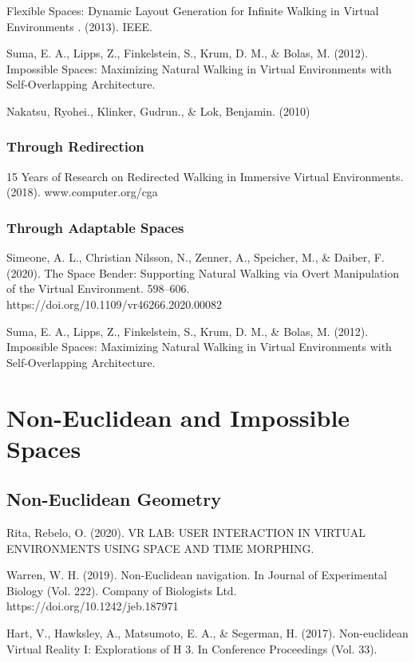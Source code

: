 Flexible Spaces: Dynamic Layout Generation for Infinite Walking in Virtual Environments . (2013). IEEE.

Suma, E. A., Lipps, Z., Finkelstein, S., Krum, D. M., \& Bolas, M. (2012). Impossible Spaces: Maximizing Natural Walking in Virtual Environments with Self-Overlapping Architecture.

Nakatsu, Ryohei., Klinker, Gudrun., \& Lok, Benjamin. (2010)

\subsubsection{Through Redirection}
\label{sec:redirection}

15 Years of Research on Redirected Walking in Immersive Virtual Environments. (2018). www.computer.org/cga

\subsubsection{Through Adaptable Spaces}
\label{sec:adaptable-spaces} 

Simeone, A. L., Christian Nilsson, N., Zenner, A., Speicher, M., \& Daiber, F. (2020). The Space Bender: Supporting Natural Walking via Overt Manipulation of the Virtual Environment. 598–606. https://doi.org/10.1109/vr46266.2020.00082

Suma, E. A., Lipps, Z., Finkelstein, S., Krum, D. M., \& Bolas, M. (2012). Impossible Spaces: Maximizing Natural Walking in Virtual Environments with Self-Overlapping Architecture.

\section{Non-Euclidean and Impossible Spaces}
\label{sec:non-euclidean-and-impossible-spaces}

\subsection{Non-Euclidean Geometry}
\label{sec:non-euclidean-geometry}

Rita, Rebelo, O. (2020). VR LAB: USER INTERACTION IN VIRTUAL ENVIRONMENTS USING SPACE AND TIME MORPHING.

Warren, W. H. (2019). Non-Euclidean navigation. In Journal of Experimental Biology (Vol. 222). Company of Biologists Ltd. https://doi.org/10.1242/jeb.187971

Hart, V., Hawksley, A., Matsumoto, E. A., \& Segerman, H. (2017). Non-euclidean Virtual Reality I: Explorations of H 3. In Conference Proceedings (Vol. 33).

